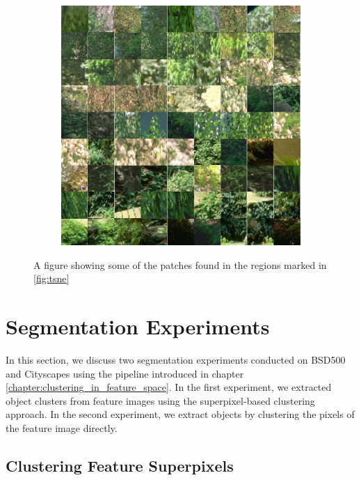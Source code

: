 \begin{figure}[!ht]
\begin{subfigure}[b]{.32\textwidth}
        \caption{}
    \end{subfigure}
    \begin{subfigure}[b]{.32\textwidth}
        \centering
        \includegraphics[width=\linewidth]{figures/tsne_f.pdf}
        \caption{}
    \end{subfigure}
    \caption{A figure showing some of the patches found in the regions marked in \autoref{fig:tsne}}
    \label{fig:tsne_clusters}
\end{figure}

\section{Segmentation Experiments}

In this section, we discuss two segmentation experiments conducted on BSD500 and Cityscapes using the pipeline introduced in chapter \ref{chapter:clustering_in_feature_space}. In the first experiment, we extracted object clusters from feature images using the superpixel-based clustering approach. In the second experiment, we extract objects by clustering the pixels of the feature image directly.

\subsection{Clustering Feature Superpixels}


